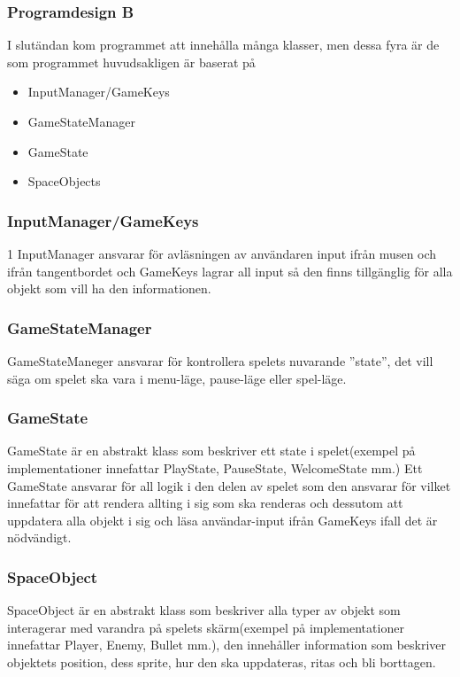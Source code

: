 \documentclass[a4paper,11pt]{article}
\begin{document}
\subsubsection{Programdesign B}

I slutändan kom programmet att innehålla många klasser, men dessa fyra är de som programmet huvudsakligen är baserat på
\begin{multicols}{2}
\begin{itemize}
\item InputManager/GameKeys
\item GameStateManager
\item GameState
\item SpaceObjects
\end{itemize}
\end{multicols}

\subsubsection{InputManager/GameKeys}
1 InputManager ansvarar för avläsningen av användaren input ifrån musen och ifrån tangentbordet och GameKeys lagrar all input så den finns tillgänglig för alla objekt som vill ha den informationen.

\subsubsection{GameStateManager}
GameStateManeger ansvarar för kontrollera spelets nuvarande ”state”, det vill säga om spelet ska vara i menu-läge, pause-läge eller spel-läge.

\subsubsection{GameState}
GameState är en abstrakt klass som beskriver ett state i spelet(exempel på implementationer innefattar PlayState, PauseState, WelcomeState mm.) Ett GameState ansvarar för all logik i den delen av spelet som den ansvarar för vilket innefattar för att rendera allting i sig som ska renderas och dessutom att uppdatera alla objekt i sig och läsa användar-input ifrån GameKeys ifall det är nödvändigt.

\subsubsection{SpaceObject}
SpaceObject är en abstrakt klass som beskriver alla typer av objekt som interagerar med varandra på spelets skärm(exempel på implementationer innefattar Player, Enemy, Bullet mm.), den innehåller information som beskriver objektets position, dess sprite, hur den ska  uppdateras, ritas och bli borttagen.
\end{document}
